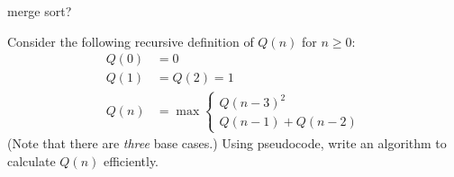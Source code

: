 \documentclass{tufte-handout}
\begin{document}
\begin{questions}
  merge sort?
\item Consider the following recursive definition of $Q(n)$ for $n
  \geq 0$:
  \begin{align*}
    Q(0) &= 0 \\
    Q(1) &= Q(2) = 1 \\
    Q(n) &= \max \begin{cases} Q(n - 3)^2 \\ Q(n-1) + Q(n-2) \end{cases}
  \end{align*}
  (Note that there are \emph{three} base cases.)  Using pseudocode,
  write an algorithm to calculate $Q(n)$ efficiently.
\end{questions}
\end{document}
